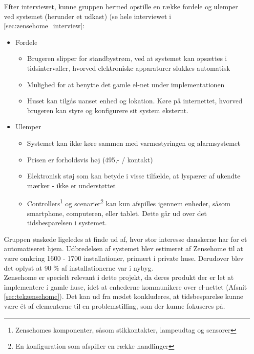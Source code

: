 Efter interviewet, kunne gruppen hermed opstille en række fordele og ulemper ved systemet (herunder et udkast) (se hele interviewet i \ref{sec:zensehome_interview}: 
\begin{itemize}
    \item Fordele
    \begin{itemize}
        \item Brugeren slipper for standbystrøm, ved at systemet kan opsættes i tidsintervaller, hvorved elektroniske apparaturer slukkes automatisk
        \item Mulighed for at benytte det gamle el-net under implementationen
        \item Huset kan tilgås uanset enhed og lokation. Køre på internettet, hvorved brugeren kan styre og konfigurere sit system eksternt.
    \end{itemize}
    \item Ulemper
    \begin{itemize}
        \item Systemet kan ikke køre sammen med varmestyringen og alarmsystemet
        \item Prisen er forholdsvis høj (495,- / kontakt)
        \item Elektronisk støj som kan betyde i visse tilfælde, at lyspærer af ukendte mærker - ikke er understøttet
        \item Controllers\footnote{Zensehomes komponenter, såsom stikkontakter, lampeudtag og sensorer} og scenarier\footnote{En konfiguration som afspiller en række handlinger} kan kun afspilles igennem enheder, såsom smartphone, computeren, eller tablet. Dette går ud over det tidsbesparelsen i systemet.
    \end{itemize}
\end{itemize}

Gruppen ønskede ligeledes at finde ud af, hvor stor interesse danskerne har for et automatiseret hjem. Udbredelsen af systemet blev estimeret af Zensehome til at være omkring 1600 - 1700 installationer, primært i private huse. Derudover blev det oplyst at 90 \% af installationerne var i nybyg.\\

Zensehome er specielt relevant i dette projekt, da deres produkt der er let at implementere i gamle huse, idet at enhederne kommunikere over el-nettet (Afsnit \ref{sec:tekzensehome}). Det kan ud fra mødet konkluderes, at tidsbesparelse kunne være ét af elementerne til en problemstilling, som der kunne fokuseres på.
